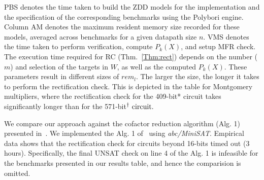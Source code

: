PBS denotes the time taken to build the ZDD models for the implementation
and the specification of the corresponding 
benchmarks using the Polybori engine. Column AM denotes the maximum
resident memory size recorded for these models,  
averaged across benchmarks for a given datapath size $n$.
VMS denotes the time
taken to perform verification, compute $P_k(X)$, and setup MFR check.
The execution time required for RC (Thm.~\ref{Thm:rect}) depends 
on the number ($m$) and selection of the targets in $W$, as well as the
computed $P_k(X)$. These parameters result in different sizes of $rem_l$. The larger the size, 
the longer it takes to perform the rectification check. This is depicted in the table for 
Montgomery multipliers, where the rectification check for the 409-bit* circuit takes 
significantly longer than for the 571-bit$\td~\text{circuit}.$ 


We compare our approach against the cofactor reduction algorithm (Alg. 1) 
presented in~\cite{MF_Huang:DATE12}. We implemented the Alg. 1 of~\cite{MF_Huang:DATE12} 
using {\it abc/MiniSAT}. Empirical data shows that the rectification check for 
circuits beyond 16-bits timed out (3 hours). Specifically, the final UNSAT 
check on line 4 of the Alg. 1 is infeasible for the benchmarks
presented in our results table, and hence the comparision is omitted.   

